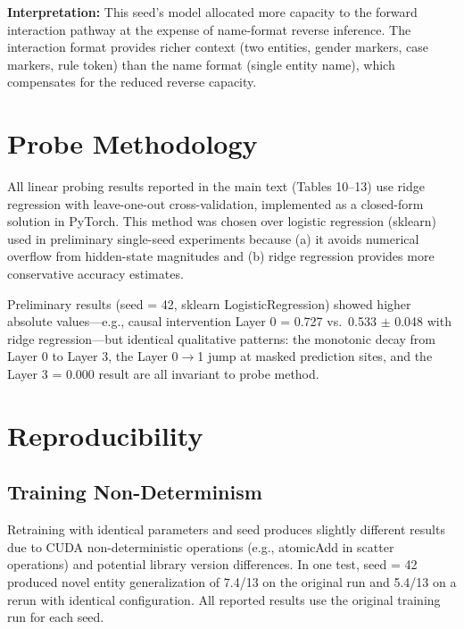 \documentclass{article}
\begin{document}
\textbf{Interpretation:} This seed's model allocated more capacity to the forward interaction pathway at the expense of name-format reverse inference. The interaction format provides richer context (two entities, gender markers, case markers, rule token) than the name format (single entity name), which compensates for the reduced reverse capacity.

\section{Probe Methodology}

All linear probing results reported in the main text (Tables 10--13) use ridge regression with leave-one-out cross-validation, implemented as a closed-form solution in PyTorch. This method was chosen over logistic regression (sklearn) used in preliminary single-seed experiments because (a) it avoids numerical overflow from hidden-state magnitudes and (b) ridge regression provides more conservative accuracy estimates.

Preliminary results (seed = 42, sklearn LogisticRegression) showed higher absolute values---e.g., causal intervention Layer 0 = 0.727 vs.\ 0.533 $\pm$ 0.048 with ridge regression---but identical qualitative patterns: the monotonic decay from Layer 0 to Layer 3, the Layer 0$\rightarrow$1 jump at masked prediction sites, and the Layer 3 = 0.000 result are all invariant to probe method.

\section{Reproducibility}

\subsection{Training Non-Determinism}

Retraining with identical parameters and seed produces slightly different results due to CUDA non-deterministic operations (e.g., atomicAdd in scatter operations) and potential library version differences. In one test, seed = 42 produced novel entity generalization of 7.4/13 on the original run and 5.4/13 on a rerun with identical configuration. All reported results use the original training run for each seed.
\end{document}
